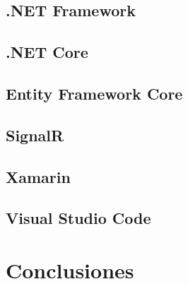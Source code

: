 \documentclass[10pt, titlepage]{article}
\begin{document}
\subsection{.NET Framework}
\subsection{.NET Core}
\subsection{Entity Framework Core}
\subsection{SignalR}
\subsection{Xamarin}
\subsection{Visual Studio Code}
\section{Conclusiones}



\end{document}
